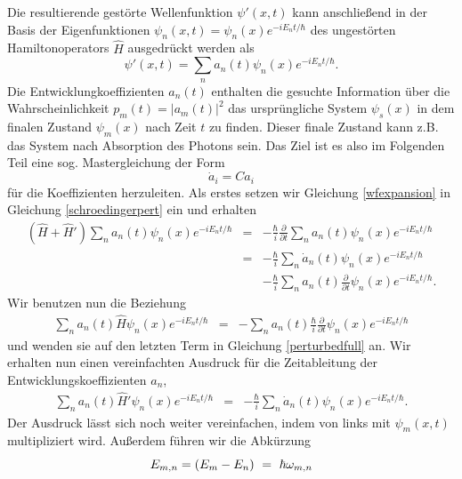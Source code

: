 \documentclass[a4paper,12pt]{article}
\begin{document}
Die resultierende gestörte Wellenfunktion $\psi'(x,t)$ kann anschließend in der Basis der Eigenfunktionen $\psi_n(x,t)=\psi_n(x) e^{-iE_nt/\hbar}$ des ungestörten Hamiltonoperators $\hat{H}$ ausgedrückt werden als
\begin{equation}\label{wfexpansion}
 \psi'(x,t)=\sum_n a_n(t) \psi_n(x) e^{-iE_nt/\hbar}.
\end{equation}
Die Entwicklungkoeffizienten $a_n(t)$ enthalten die gesuchte Information über die Wahrscheinlichkeit $p_m(t)=|a_m(t)|^2$ das ursprüngliche System $\psi_s(x)$ in dem finalen Zustand $\psi_m(x)$ 
nach Zeit $t$ zu finden. Dieser finale Zustand kann z.B. das System nach Absorption des Photons sein. Das Ziel ist es also im Folgenden Teil eine sog. Mastergleichung der Form
\begin{equation}
 \dot{a}_i=C a_i
\end{equation}
für die Koeffizienten herzuleiten. Als erstes setzen wir Gleichung \ref{wfexpansion} in Gleichung \ref{schroedingerpert} ein und erhalten
\begin{eqnarray}\label{perturbedfull}
  (\hat{H}+\hat{H}')\sum_n a_n(t) \psi_n(x) e^{-iE_nt/\hbar}&=&-\frac{\hbar}{i}\frac{\partial}{\partial t}\sum_n a_n(t) \psi_n(x) e^{-iE_nt/\hbar} \nonumber\\
              &=&-\frac{\hbar}{i}\sum_n \dot{a}_n(t) \psi_n(x) e^{-iE_nt/\hbar} \nonumber \\
              & &-\frac{\hbar}{i}\sum_n a_n(t) \frac{\partial}{\partial t} \psi_n(x) e^{-iE_nt/\hbar}.
\end{eqnarray}
Wir benutzen nun die Beziehung
\begin{eqnarray}\label{perturbedfull2}
  \sum_n a_n(t) \hat{H} \psi_n(x) e^{-iE_nt/\hbar} & =&-\sum_n a_n(t) \frac{\hbar}{i} \frac{\partial}{\partial t} \psi_n(x) e^{-iE_nt/\hbar}
\end{eqnarray}
und wenden sie auf den letzten Term in Gleichung \ref{perturbedfull} an. Wir erhalten nun einen vereinfachten Ausdruck für die Zeitableitung der Entwicklungskoeffizienten $a_n$,
\begin{eqnarray}
  \sum_n a_n(t)  \hat{H}'\psi_n(x) e^{-iE_nt/\hbar}&=&-\frac{\hbar}{i}\sum_n \dot{a}_n(t) \psi_n(x) e^{-iE_nt/\hbar}. 
\end{eqnarray}
Der Ausdruck lässt sich noch weiter vereinfachen, indem von links mit $\psi_m(x,t)$ multipliziert wird. Außerdem führen wir die Abkürzung
\begin{equation}
 E_{m,n} = (E_m-E_n)~=~\hbar\omega_{m,n}\nonumber\\ 
\end{equation}
\end{document}

